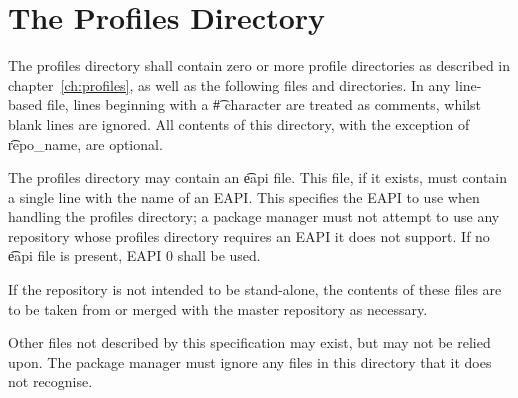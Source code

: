 \section{The Profiles Directory}
\label{sec:profiles-dir}

The profiles directory shall contain zero or more profile directories as described in
chapter~\ref{ch:profiles}, as well as the following files and directories. In any line-based file,
lines beginning with a \t{\#} character are treated as comments, whilst blank lines are ignored.
All contents of this directory, with the exception of \t{repo_name}, are optional.

The profiles directory may contain an \t{eapi} file. This file, if it exists, must contain a single
line with the name of an EAPI\@. This specifies the EAPI to use when handling the profiles
directory; a package manager must not attempt to use any repository whose profiles directory
requires an EAPI it does not support. If no \t{eapi} file is present, EAPI 0 shall be used.

If the repository is not intended to be stand-alone, the contents of these files are to be taken
from or merged with the master repository as necessary.

Other files not described by this specification may exist, but may not be relied upon. The package
manager must ignore any files in this directory that it does not recognise.

